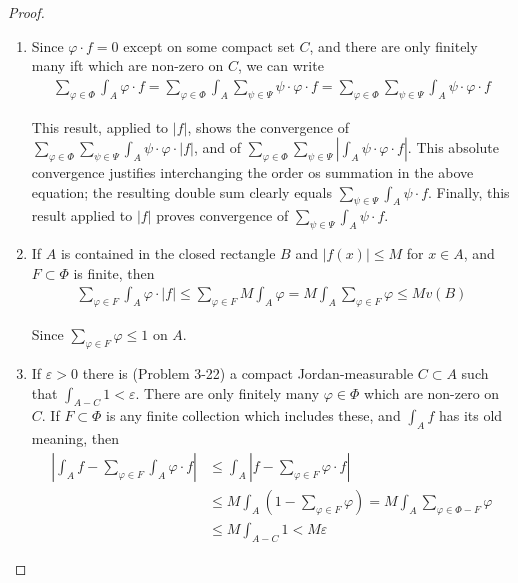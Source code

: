 \begin{proof}
    \begin{enumerate}[label=\upshape{(\arabic*)}]
        \item Since $\varphi\cdot f = 0$ except on some compact set $C$, and there
            are only finitely many ift which are non-zero on $C$, we can write
            \begin{align*}
                \sum_{\varphi\in\Phi}\int_A\varphi\cdot f=\sum_{\varphi\in\Phi}\int_A\sum_{\psi\in\Psi}\psi\cdot\varphi\cdot f=\sum_{\varphi\in\Phi}\sum_{\psi\in\Psi}\int_A\psi\cdot\varphi\cdot f
            \end{align*}

            This result, applied to $|f|$, shows the convergence of\\
            $\sum_{\varphi\in\Phi}^{}{\sum_{\psi\in\Psi}^{}{\int_A \psi\cdot \varphi\cdot |f|}}$, and of $\sum_{\varphi\in\Phi}^{}
            {\sum_{\psi\in\Psi}^{}{|\int_A \psi\cdot\varphi\cdot f|}}$. This absolute convergence justifies interchanging
            the order os summation in the above equation; the resulting double sum clearly equals $\sum_{\psi\in\Psi}^{
            }{\int_A \psi\cdot f}$. Finally, this result applied to $|f|$ proves convergence of 
            $\sum_{\psi\in\Psi}^{}{\int_A \psi\cdot f}$.
        \item If $A$ is contained in the closed rectangle $B$ and $|f(x)| \le M$
            for $x\in A$, and $F\subset \Phi$ is finite, then
            \begin{align*}
                \sum_{\varphi\in F}\int_{A}\varphi\cdot|f|\leq\sum_{\varphi\in F}M\int_{A}\varphi=M\int_{A}\sum_{\varphi\in F}\varphi\leq Mv(B)
            \end{align*}

            Since $\sum_{\varphi\in F}^{}{\varphi} \le 1$ on $A$.
        \item If $\varepsilon > 0$ there is (Problem 3-22) a compact Jordan-measurable 
            $C \subset A$ such that $\int_{A-C} 1<\varepsilon$. There are only
            finitely many $\varphi\in\Phi$ which are non-zero on $C$. If $F \subset \Phi$
            is any finite collection which includes these, and $\int_A f$ has its old meaning, 
            then 
            \begin{align*}
                \left|\int_A f - \sum_{\varphi\in F}^{}{\int_A \varphi\cdot f}\right|
                & \le \int_A \left|f-\sum_{\varphi\in F}^{}{\varphi\cdot f}\right| \\
                & \le M \int_A \left(1-\sum_{\varphi\in F}^{}{\varphi}\right) 
                    = M \int_A \sum_{\varphi\in \Phi - F}^{}{\varphi} \\
                & \le M \int_{A-C} 1
                    < M\varepsilon
            \end{align*}
    \end{enumerate}
\end{proof}


